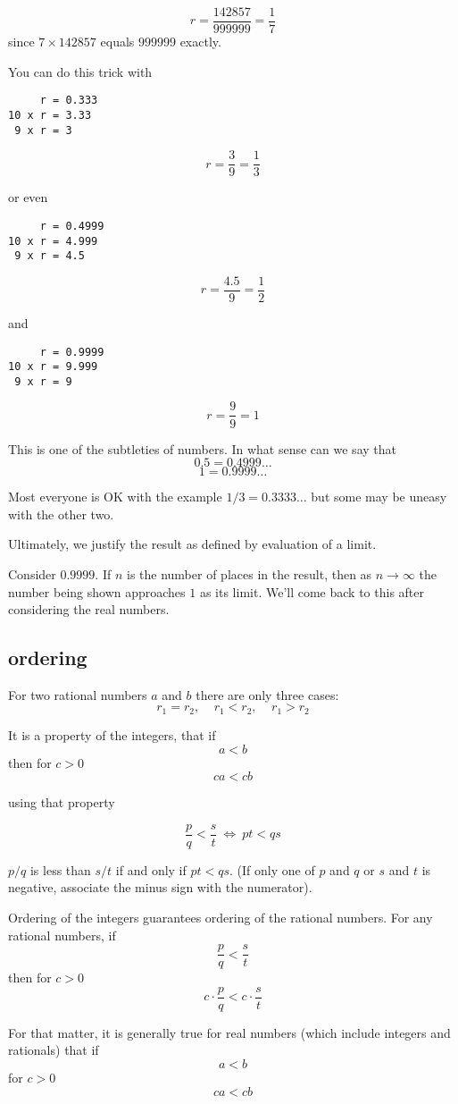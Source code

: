 \documentclass[11pt, oneside]{article}
\begin{document}
\[ r = \frac{142857}{999999} = \frac{1}{7} \]
since $7 \times 142857$ equals $999999$ exactly.

You can do this trick with 

\begin{verbatim}
     r = 0.333
10 x r = 3.33
 9 x r = 3
\end{verbatim}

\[ r = \frac{3}{9} = \frac{1}{3} \]

or even

\begin{verbatim}
     r = 0.4999
10 x r = 4.999
 9 x r = 4.5
\end{verbatim}

\[ r = \frac{4.5}{9} = \frac{1}{2} \]

and

\begin{verbatim}
     r = 0.9999
10 x r = 9.999
 9 x r = 9
\end{verbatim}

\[ r = \frac{9}{9} = 1 \]

This is one of the subtleties of numbers.  In what sense can we say that 
\[ 0.5 = 0.4999 \dots \]
\[ 1 = 0.9999 \dots \]

Most everyone is OK with the example $1/3 = 0.3333 \dots$ but some may be uneasy with the other two.

Ultimately, we justify the result as defined by evaluation of a limit.  

Consider $0.9999$.  If $n$ is the number of places in the result, then as $n \rightarrow \infty$ the number being shown approaches $1$ as its limit.  We'll come back to this after considering the real numbers.

\subsection*{ordering}
For two rational numbers $a$ and $b$ there are only three cases:  
\[ r_1 = r_2, \ \ \ \ \ r_1 < r_2, \ \ \ \ \ r_1 > r_2 \]

It is a property of the integers, that if
\[ a < b \]
then for $c > 0$
\[ ca < cb \]

using that property

\[ \frac{p}{q} < \frac{s}{t} \ \iff \ pt < qs \]

$p/q$ is less than $s/t$ if and only if $pt < qs$.  (If only one of $p$ and $q$ or $s$ and $t$ is negative, associate the minus sign with the numerator).

Ordering of the integers guarantees ordering of the rational numbers.  For any rational numbers, if
\[ \frac{p}{q} < \frac{s}{t} \]
then for $c > 0$
\[ c \cdot \frac{p}{q} < c \cdot \frac{s}{t} \]

For that matter, it is generally true for real numbers (which include integers and rationals) that if
\[ a < b \]
for $c > 0$
\[ ca < cb \]
\end{document}
